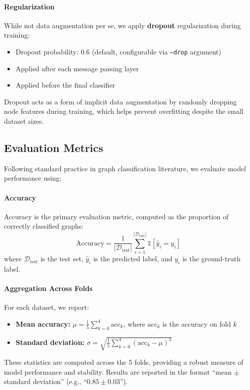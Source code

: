 \paragraph{Regularization}
While not data augmentation per se, we apply \textbf{dropout} regularization during training:
\begin{itemize}
    \item Dropout probability: 0.6 (default, configurable via \texttt{--drop} argument)
    \item Applied after each message passing layer
    \item Applied before the final classifier
\end{itemize}
Dropout acts as a form of implicit data augmentation by randomly dropping node features during training, which helps prevent overfitting despite the small dataset sizes.

\subsection{Evaluation Metrics}

Following standard practice in graph classification literature, we evaluate model performance using:

\paragraph{Accuracy}
Accuracy is the primary evaluation metric, computed as the proportion of correctly classified graphs:
\begin{equation}
\text{Accuracy} = \frac{1}{|\mathcal{D}_{\text{test}}|} \sum_{i=1}^{|\mathcal{D}_{\text{test}}|} \mathbb{1}[\hat{y}_i = y_i]
\end{equation}
where $\mathcal{D}_{\text{test}}$ is the test set, $\hat{y}_i$ is the predicted label, and $y_i$ is the ground-truth label.

\paragraph{Aggregation Across Folds}
For each dataset, we report:
\begin{itemize}
    \item \textbf{Mean accuracy:} $\mu = \frac{1}{5}\sum_{k=0}^{4} \text{acc}_k$, where $\text{acc}_k$ is the accuracy on fold $k$
    \item \textbf{Standard deviation:} $\sigma = \sqrt{\frac{1}{5}\sum_{k=0}^{4} (\text{acc}_k - \mu)^2}$
\end{itemize}
These statistics are computed across the 5 folds, providing a robust measure of model performance and stability. Results are reported in the format ``mean $\pm$ standard deviation'' (e.g., ``$0.85 \pm 0.03$'').
